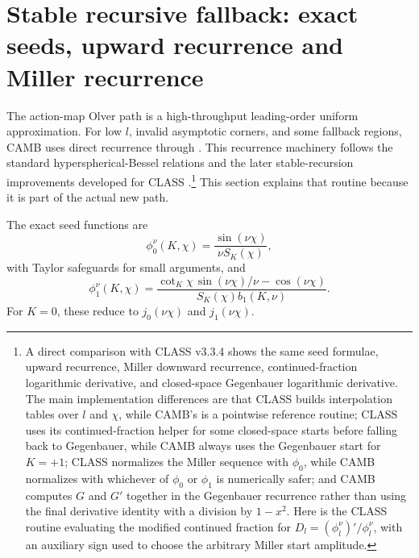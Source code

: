\documentclass[11pt,a4paper]{article}
\newcommand{\code}[1]{\texttt{\detokenize{#1}}}
\newcommand{\SK}{S_K}
\newcommand{\cotK}{\cot_K}
\begin{document}
\section{Stable recursive fallback: exact seeds, upward recurrence and Miller recurrence}

The action-map Olver path is a high-throughput leading-order uniform approximation.  For low \(l\), invalid asymptotic corners, and some fallback regions, CAMB uses direct recurrence through \code{phi_recurs}.  This recurrence machinery follows the standard hyperspherical-Bessel relations and the later stable-recursion improvements developed for \textsc{CLASS} \cite{abbott-schaefer,tram2013,lesgourgues-tram2013}.\footnote{A direct comparison with \textsc{CLASS} v3.3.4 shows the same seed formulae, upward recurrence, Miller downward recurrence, continued-fraction logarithmic derivative, and closed-space Gegenbauer logarithmic derivative.  The main implementation differences are that \textsc{CLASS} builds interpolation tables over \(l\) and \(\chi\), while CAMB's \code{phi_recurs} is a pointwise reference routine; \textsc{CLASS} uses its \code{get_CF1} continued-fraction helper for some closed-space starts before falling back to Gegenbauer, while CAMB always uses the Gegenbauer start for \(K=+1\); \textsc{CLASS} normalizes the Miller sequence with \(\phi_0\), while CAMB normalizes with whichever of \(\phi_0\) or \(\phi_1\) is numerically safer; and CAMB computes \(G\) and \(G'\) together in the Gegenbauer recurrence rather than using the final derivative identity with a division by \(1-x^2\).  Here \code{get_CF1} is the \textsc{CLASS} routine evaluating the modified continued fraction for \(D_l=(\phi_l^\nu)'/\phi_l^\nu\), with an auxiliary sign used to choose the arbitrary Miller start amplitude.}  This section explains that routine because it is part of the actual new path.

The exact seed functions are
\begin{equation}
  \phi_0^\nu(K,\chi)=\frac{\sin(\nu\chi)}{\nu\SK(\chi)},
  \label{eq:phi0}
\end{equation}
with Taylor safeguards for small arguments, and
\begin{equation}
  \phi_1^\nu(K,\chi)=
  \frac{\cotK\chi\,\sin(\nu\chi)/\nu-\cos(\nu\chi)}{\SK(\chi)b_1(K,\nu)}.
  \label{eq:phi1}
\end{equation}
For \(K=0\), these reduce to \(j_0(\nu\chi)\) and \(j_1(\nu\chi)\).
\end{document}

